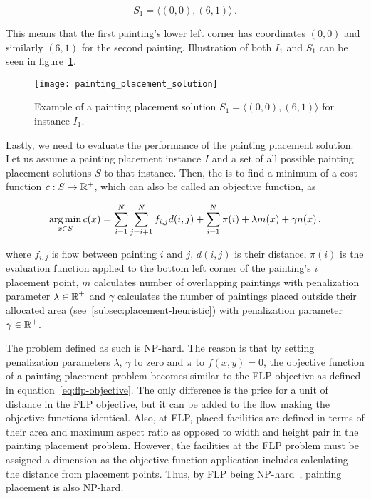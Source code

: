 \[
    S_1 = \langle (0,0), (6,1) \rangle \,.
\]

This means that the first painting's lower left corner has coordinates $(0,0)$
and similarly $(6,1)$ for the second painting.
Illustration of both $I_1$ and $S_1$ can be seen in figure~\ref{fig:painting-placement-solution}.

\begin{figure}
    \texttt{[image: painting\_placement\_solution]}
    \caption[Example of a painting placement solution]{Example of a painting placement solution $S_1 = \langle (0,0), (6,1) \rangle$ for instance $I_1$.}
    \label{fig:painting-placement-solution}
\end{figure}

\newpage

Lastly, we need to evaluate the performance of the painting placement solution.
Let us assume a painting placement instance $I$ and a set of all possible painting placement solutions $S$ to that instance.
Then, the  is to find a minimum of a cost function $c: S \to \operatorname*{\mathbb{R}^+}$,
which can also be called an objective function, as


\begin{equation}
    \operatorname*{arg\,min}_{x \in S} c(x) = \sum\limits_{i=1}^N\sum\limits_{j=i+1}^N f_{i,j}d(i, j) + \sum\limits_{i=1}^N \pi(i) + \lambda m(x) + \gamma n(x) \,,
    \label{eq:objective}
\end{equation}

where $f_{i,j}$ is flow between painting $i$ and $j$, $d(i,j)$ is their distance,
$\pi(i)$ is the evaluation function applied to the bottom left corner of the painting's $i$  placement point,
$m$ calculates number of overlapping paintings with penalization parameter $\lambda \in \operatorname*{\mathbb{R}}^+$
and $\gamma$ calculates the number of paintings placed outside their allocated area (see~\ref{subsec:placement-heuristic})
with penalization parameter $\gamma \in \operatorname*{\mathbb{R}}^+$.

The problem defined as such is NP-hard.
The reason is that by setting penalization parameters $\lambda$, $\gamma$ to zero and $\pi$ to $f(x,y) = 0$,
the objective function of a painting placement problem becomes similar to the FLP objective as defined in equation~\ref{eq:flp-objective}.
The only difference is the price for a unit of distance in the FLP objective, but it can be added to the flow making the objective functions identical.
Also, at FLP, placed facilities are defined in terms of their area and maximum aspect ratio as opposed to width and height pair in the painting placement problem.
However, the facilities at the FLP problem must be assigned a dimension as the objective function application includes calculating the distance from placement points.
Thus, by FLP being NP-hard~\cite{liuMultiobjectiveParticleSwarm2018, goncalvesBiasedRandomkeyGenetic2015, friedrichIntegratedSlicingTree2018}, painting placement is also NP-hard.
